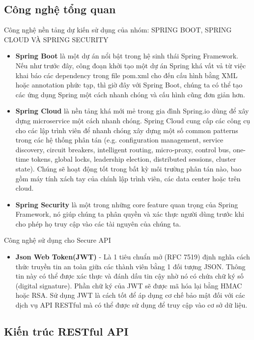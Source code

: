 		\subsection{Công nghệ tổng quan}
		Công nghệ nền tảng dự kiến sử dụng của nhóm: SPRING BOOT, SPRING CLOUD VÀ SPRING SECURITY
		\begin{itemize}
		    \item \textbf{Spring Boot} \cite{Spring} là một dự án nổi bật trong hệ sinh thái Spring Framework. Nếu như trước đây, công đoạn khởi tạo một dự án Spring khá vất vả từ việc khai báo các dependency trong file pom.xml cho đến cấu hình bằng XML hoặc annotation phức tạp, thì giờ đây với Spring Boot, chúng ta có thể tạo các ứng dụng Spring một cách nhanh chóng và cấu hình cũng đơn giản hơn.
		    \item \textbf{Spring Cloud} \cite{Spring} là nền tảng khá mới mẻ trong gia đình Spring.io dùng để xây dựng microservice một cách nhanh chóng. Spring Cloud cung cấp các công cụ cho các lập trình viên để nhanh chóng xây dựng một số common patterns trong các hệ thống phân tán (e.g. configuration management, service discovery, circuit breakers, intelligent routing, micro-proxy, control bus, one-time tokens, global locks, leadership election, distributed sessions, cluster state). Chúng sẽ hoạt động tốt trong bất kỳ môi trường phân tán nào, bao gồm máy tính xách tay của chính lập trình viên, các data center hoặc trên cloud.
		    \item \textbf{Spring Security} là một trong những core feature quan trọng của Spring Framework, nó giúp chúng ta phân quyền và xác thực người dùng trước khi cho phép họ truy cập vào các tài nguyên của chúng ta. 
		\end{itemize}
		Công nghệ sử dụng cho Secure API
		\begin{itemize}
		    \item \textbf{Json Web Token(JWT)} \cite{JWT}- Là 1 tiêu chuẩn mở (RFC 7519) định nghĩa cách thức truyền tin an toàn giữa các thành viên bằng 1 đối tượng JSON. Thông tin này có thể được xác thực và đánh dấu tin cậy nhờ nó có chứa chữ ký số (digital signature). Phần chữ ký của JWT sẽ được mã hóa lại bằng HMAC hoặc RSA. Sử dụng JWT là cách tốt để áp dụng cơ chế bảo mật đối với các dịch vụ API RESTful mà có thể được sử dụng để truy cập vào cơ sở dữ liệu.
		\end{itemize}
        \subsection{Kiến trúc RESTful API}
		    
